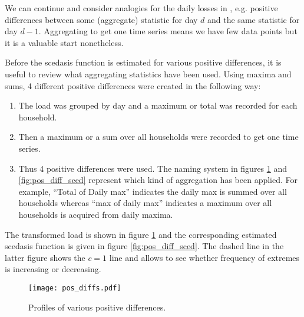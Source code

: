 We can continue and consider analogies for the daily losses in \cite{einmahl16}, e.g. positive differences between some (aggregate) statistic for day $d$ and the same statistic for day $d-1$. Aggregating to get one time series means we have few data points but it is a valuable start nonetheless. %

Before the scedasis function is estimated for various positive differences, it is useful to review what aggregating statistics have been used. Using maxima and sums, %
4 different positive differences were created in the following way:
\begin{enumerate}
\item The load was grouped by day and a maximum or total was recorded for each household.
\item Then a maximum or a sum over all households were recorded to get one time series.
\item Thus 4 positive differences were used. The naming system in figures \ref{fig:pos_diff} and \ref{fig:pos_diff_sced} represent which kind of aggregation has been applied. For example, ``Total of Daily max'' indicates the  daily max is summed over all households whereas ``max of daily max'' indicates a maximum over all households is acquired from daily maxima.
\end{enumerate}
The transformed load is shown in  figure \ref{fig:pos_diff} and the corresponding estimated scedasis function is given in figure \ref{fig:pos_diff_sced}. The dashed line in the latter figure shows the $c=1$ line and allows to see whether frequency of extremes is increasing or decreasing.


\begin{figure}
\centering
\texttt{[image: pos\_diffs.pdf]}
\caption{\label{fig:pos_diff} Profiles of various positive differences.}
\end{figure}

